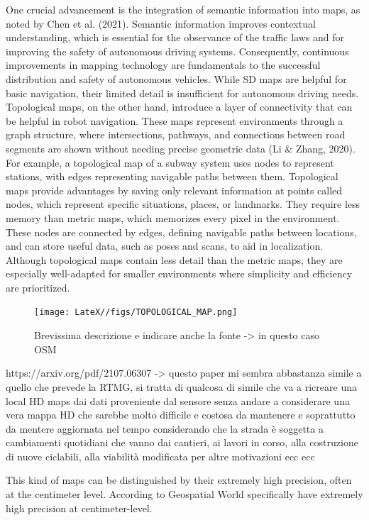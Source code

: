 One crucial advancement is the integration of semantic information into maps, as noted by Chen et al. (2021). Semantic information improves contextual understanding, which is essential for the observance of the traffic laws and for improving the safety of autonomous driving systems. Consequently, continuous improvements in mapping technology are fundamentals to the successful distribution and safety of autonomous vehicles.
While SD maps are helpful for basic navigation, their limited detail is insufficient for autonomous driving needs. Topological maps, on the other hand, introduce a layer of connectivity that can be helpful in robot navigation. These maps represent environments through a graph structure, where intersections, pathways, and connections between road segments are shown without needing precise geometric data (Li & Zhang, 2020). For example, a topological map of a subway system uses nodes to represent stations, with edges representing navigable paths between them.
Topological maps provide advantages by saving only relevant information at points called nodes, which represent specific situations, places, or landmarks. They require less memory than metric maps, which memorizes every pixel in the environment. These nodes are connected by edges, defining navigable paths between locations, and can store useful data, such as poses and scans, to aid in localization. Although topological maps contain less detail than the metric maps, they are especially well-adapted for smaller environments where simplicity and efficiency are prioritized.
\begin{figure}
    \centering
    \texttt{[image: LateX//figs/TOPOLOGICAL\_MAP.png]}
    \caption{Brevissima descrizione e indicare anche la fonte -> in questo caso OSM}
    \label{fig:enter-label}
\end{figure}

https://arxiv.org/pdf/2107.06307 -> questo paper mi sembra abbastanza simile a quello che prevede la RTMG, si tratta di qualcosa di simile che va a ricreare una local HD maps dai dati proveniente dal sensore senza andare a considerare una vera mappa HD che sarebbe molto difficile e costosa da mantenere e soprattutto da mentere aggiornata nel tempo considerando che la strada è soggetta a cambiamenti quotidiani che vanno dai cantieri, ai lavori in corso, alla costruzione di nuove ciclabili, alla viabilità modificata per altre motivazioni ecc ecc


This kind of maps can be distinguished by their extremely high precision, often at the centimeter level. According to Geospatial World specifically have extremely high precision at centimeter-level.

